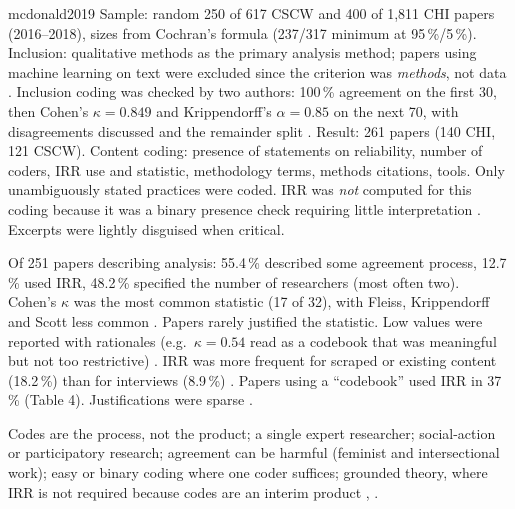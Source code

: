 \begin{papercard}{mcdonald2019}
 Sample: random 250 of 617 CSCW and 400 of 1,811 CHI papers (2016--2018), sizes from Cochran's formula (237/317 minimum at 95\,\%/5\,\%). Inclusion: qualitative methods as the primary analysis method; papers using machine learning on text were excluded since the criterion was \emph{methods}, not data . Inclusion coding was checked by two authors: 100\,\% agreement on the first 30, then Cohen's $\kappa=0.849$ and Krippendorff's $\alpha=0.85$ on the next 70, with disagreements discussed and the remainder split . Result: 261 papers (140 CHI, 121 CSCW). Content coding: presence of statements on reliability, number of coders, IRR use and statistic, methodology terms, methods citations, tools. Only unambiguously stated practices were coded. IRR was \emph{not} computed for this coding because it was a binary presence check requiring little interpretation . Excerpts were lightly disguised when critical.

 Of 251 papers describing analysis: 55.4\,\% described some agreement process, 12.7\,\% used IRR, 48.2\,\% specified the number of researchers (most often two). Cohen's $\kappa$ was the most common statistic (17 of 32), with Fleiss, Krippendorff and Scott less common . Papers rarely justified the statistic. Low values were reported with rationales (e.g.\ $\kappa=0.54$ read as a codebook that was meaningful but not too restrictive) . IRR was more frequent for scraped or existing content (18.2\,\%) than for interviews (8.9\,\%) . Papers using a ``codebook'' used IRR in 37\,\% (Table 4). Justifications were sparse .

 Codes are the process, not the product; a single expert researcher; social-action or participatory research; agreement can be harmful (feminist and intersectional work); easy or binary coding where one coder suffices; grounded theory, where IRR is not required because codes are an interim product , .


\end{papercard}
